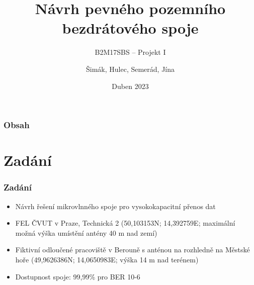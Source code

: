 \documentclass[aspectratio=169, 12pt, hyperref={unicode}]{beamer}
\title{Návrh pevného pozemního bezdrátového spoje}
\subtitle{B2M17SBS -- Projekt I}
\author{Šimák, Hulec, Semerád, Jína}
\date{Duben 2023}
\begin{document}

\begin{frame}
\titlepage
\end{frame}

\begin{frame}
\frametitle{Obsah}
\tableofcontents
\end{frame}

\section{Zadání}
\begin{frame}
\frametitle{Zadání}
\begin{itemize}
\item Návrh řešení mikrovlnného spoje pro vysokokapacitní přenos dat
\item FEL ČVUT v Praze, Technická 2 (50,103153N; 14,392759E; maximální možná
výška umístění antény 40 m nad zemí)
\item  Fiktivní odloučené pracoviště v Berouně s anténou na rozhledně na Městské hoře (49,9626386N; 14,0650983E; výška 14 m nad terénem)
\item Dostupnost spoje: 99,99\% pro BER 10-6
\end{itemize}
\end{frame}
\end{document}
